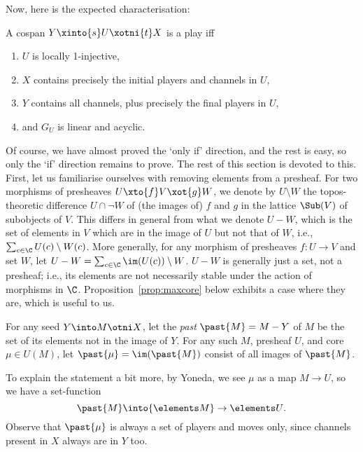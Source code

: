 \documentclass{LMCS}
\theoremstyle{plain}\newtheorem{satz}[thm]{Satz}
\begin{document}
Now, here is the expected characterisation:
\begin{thm}\label{thm:completeness}
  A cospan $Y \xinto{s} U \xotni{t} X$ is a play iff
  \begin{enumerate}[label=(\roman*)]
\item $U$ is locally 1-injective, \label{cond:locinj}
  \item $X$ contains precisely the initial players and channels in
    $U$, \label{cond:X}
  \item $Y$ contains all channels, plus precisely the final players in
    $U$, \label{cond:Y}
  \item and $G_U$ is linear and acyclic. \label{cond:causality}
  \end{enumerate}
\end{thm}
Of course, we have almost proved the `only if' direction, and the rest
is easy, so only the `if' direction remains to prove. The rest of this
section is devoted to this. First, let us familiarise ourselves with
removing elements from a presheaf. For two morphisms of presheaves $U
\xto{f} V \xot{g} W$, we denote by $U \setminus W$ the topos-theoretic
difference $U \cap \neg W$ of (the images of) $f$ and $g$ in the
lattice $\Sub (V)$ of subobjects of $V$. This differs in general from
what we denote $U - W$, which is the set of elements in $V$ which are
in the image of $U$ but not that of $W$, i.e., $\sum_{c \in \C} U (c)
\setminus W (c)$. More generally, for any morphism of presheaves $f
\colon U \to V$ and set $W$, let $U - W = \sum_{c \in \C} \im(U (c))
\setminus W$.  $U - W$ is generally just a set, not a presheaf; i.e.,
its elements are not necessarily stable under the action of morphisms
in $\C$. Proposition~\ref{prop:maxcore} below exhibits a case where
they are, which is useful to us.
\begin{defi}
  For any seed $Y \into M \otni X$, let the \emph{past}
  $\past{M} = M - Y$ of $M$ be the set of its elements not in the
  image of $Y$.  For any such $M$, presheaf $U$, and core $\mu \in U
  (M)$, let $\past{\mu} = \im(\past{M})$ consist of all images of
  $\past{M}$.
\end{defi}
To explain the statement a bit more, by Yoneda, we see $\mu$ as a map
$M \to U$, so we have a set-function $$\past{M} \into {\elements M}
\to {\elements U}.$$ Observe that $\past{\mu}$ is always a set of
players and moves only, since channels present in $X$ always are in
$Y$ too.
\end{document}
